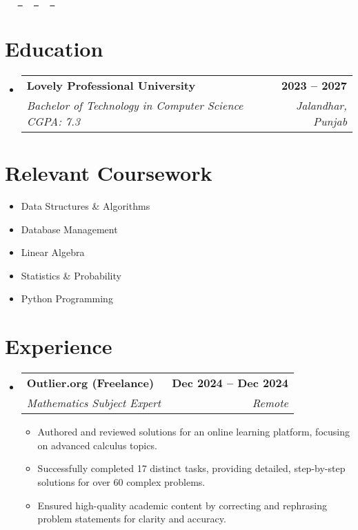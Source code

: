\documentclass[letterpaper,11pt]{article}
\makeatletter
\newcommand{\resumeItem}[1]{
  \item\small{
    {#1 \vspace{-2pt}}
  }
}
\newcommand{\resumeSubheading}[4]{
  \vspace{-2pt}\item
    \begin{tabular*}{1.0\textwidth}[t]{l@{\extracolsep{\fill}}r}
      \textbf{#1} & \textbf{\small #2} \\
      \textit{\small#3} & \textit{\small #4} \\
    \end{tabular*}\vspace{-7pt}
}
\newcommand{\resumeSubHeadingListStart}{\begin{itemize}[leftmargin=0.0in, label={}]}
\newcommand{\resumeSubHeadingListEnd}{\end{itemize}}
\newcommand{\resumeItemListStart}{\begin{itemize}}
\newcommand{\resumeItemListEnd}{\end{itemize}\vspace{-5pt}}
\makeatother
\begin{document}
\begin{center}
    {\Huge \scshape \myname} \\ \vspace{1pt}
    \mycity \\ \vspace{1pt}
    \small \raisebox{-0.1\height}\faPhone\ \myphone ~ \href{mailto:\myemail}{\raisebox{-0.2\height}\faEnvelope\  \underline{\myemail}} ~ 
    \href{\mylinkedinurl}{\raisebox{-0.2\height}\faLinkedin\ \underline{\mylinkedintext}}  ~
    \href{\mygithuburl}{\raisebox{-0.2\height}\faGithub\ \underline{\mygithubtext}}
    \vspace{-8pt}
\end{center}



\section{Education}
  \resumeSubHeadingListStart
    \resumeSubheading
      {Lovely Professional University}{2023 -- 2027}
      {Bachelor of Technology in Computer Science \quad \emph{CGPA: 7.3}}{Jalandhar, Punjab}
  \resumeSubHeadingListEnd
\section{Relevant Coursework}
    \begin{multicols}{3}
        \begin{itemize}[itemsep=-5pt, parsep=3pt]
            \item\small Data Structures \&  Algorithms
            \item\small Database Management
            \item\small Linear Algebra
            \item\small Statistics \&  Probability
            \item\small Python Programming
        \end{itemize}
    \end{multicols}
    \vspace*{2.0\multicolsep}

\section{Experience}
  \resumeSubHeadingListStart
    \resumeSubheading
      {Outlier.org (Freelance)}{Dec 2024 -- Dec 2024}
      {Mathematics Subject Expert}{Remote}
      \resumeItemListStart
        \resumeItem{Authored and reviewed solutions for an online learning platform, focusing on advanced calculus topics.}
        \resumeItem{Successfully completed 17 distinct tasks, providing detailed, step-by-step solutions for over 60 complex problems.}
        \resumeItem{Ensured high-quality academic content by correcting and rephrasing problem statements for clarity and accuracy.}
      \resumeItemListEnd
  \resumeSubHeadingListEnd
\end{document}
